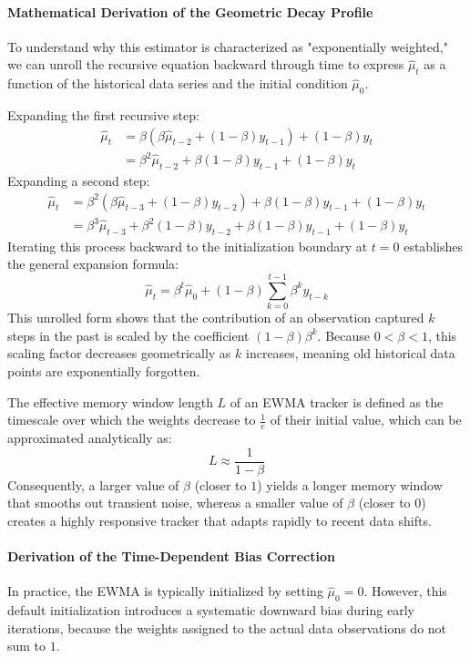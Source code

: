 \documentclass{article}
\begin{document}
\paragraph{Mathematical Derivation of the Geometric Decay Profile}
To understand why this estimator is characterized as "exponentially weighted," we can unroll the recursive equation backward through time to express $\hat{\mu}_t$ as a function of the historical data series and the initial condition $\hat{\mu}_0$.

Expanding the first recursive step:
\begin{align*}
\hat{\mu}_t &= \beta \left( \beta \hat{\mu}_{t-2} + (1 - \beta) y_{t-1} \right) + (1 - \beta) y_t \\
&= \beta^2 \hat{\mu}_{t-2} + \beta(1 - \beta) y_{t-1} + (1 - \beta) y_t
\end{align*}
Expanding a second step:
\begin{align*}
\hat{\mu}_t &= \beta^2 \left( \beta \hat{\mu}_{t-3} + (1 - \beta) y_{t-2} \right) + \beta(1 - \beta) y_{t-1} + (1 - \beta) y_t \\
&= \beta^3 \hat{\mu}_{t-3} + \beta^2(1 - \beta) y_{t-2} + \beta(1 - \beta) y_{t-1} + (1 - \beta) y_t
\end{align*}
Iterating this process backward to the initialization boundary at $t = 0$ establishes the general expansion formula:
\begin{equation}
\hat{\mu}_t = \beta^t \hat{\mu}_0 + (1 - \beta) \sum_{k=0}^{t-1} \beta^k y_{t-k}
\end{equation}
This unrolled form shows that the contribution of an observation captured $k$ steps in the past is scaled by the coefficient $(1 - \beta)\beta^k$. Because $0 < \beta < 1$, this scaling factor decreases geometrically as $k$ increases, meaning old historical data points are exponentially forgotten. 

The effective memory window length $L$ of an EWMA tracker is defined as the timescale over which the weights decrease to $\frac{1}{e}$ of their initial value, which can be approximated analytically as:
\begin{equation}
L \approx \frac{1}{1 - \beta}
\end{equation}
Consequently, a larger value of $\beta$ (closer to $1$) yields a longer memory window that smooths out transient noise, whereas a smaller value of $\beta$ (closer to $0$) creates a highly responsive tracker that adapts rapidly to recent data shifts.

\paragraph{Derivation of the Time-Dependent Bias Correction}
In practice, the EWMA is typically initialized by setting $\hat{\mu}_0 = 0$. However, this default initialization introduces a systematic downward bias during early iterations, because the weights assigned to the actual data observations do not sum to $1$. 
\end{document}
